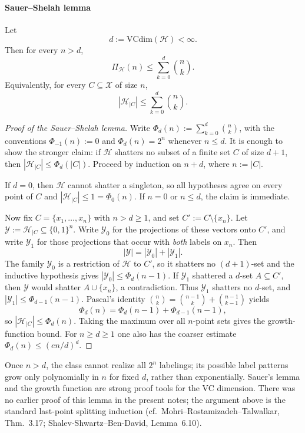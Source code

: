 \documentclass[11pt,a4paper]{article}
\theoremstyle{definition}
\begin{document}
\paragraph{Sauer--Shelah lemma}
\label{lem:sauer-shelah}

Let
\[
d := \text{VCdim}(\mathcal{H}) < \infty.
\]
Then for every $n > d$,
\[
\Pi_{\mathcal{H}}(n) \leq \sum_{k=0}^{d} \binom{n}{k}.
\]
Equivalently, for every $C \subseteq \mathcal{X}$ of size $n$,
\[
|\mathcal{H}_{|C}| \leq \sum_{k=0}^{d} \binom{n}{k}.
\]
\begin{proof}[Proof of the Sauer--Shelah lemma]
\label{prf:sauer-shelah}
Write \(\Phi_d(n):=\sum_{k=0}^{d}\binom{n}{k}\), with the conventions \(\Phi_{-1}(n):=0\) and \(\Phi_d(n)=2^n\) whenever \(n\le d\). It is enough to show the stronger claim: if \(\mathcal{H}\) shatters no subset of a finite set \(C\) of size \(d+1\), then \(|\mathcal{H}_{|C}|\le\Phi_d(|C|)\). Proceed by induction on \(n+d\), where \(n:=|C|\).

If \(d=0\), then \(\mathcal{H}\) cannot shatter a singleton, so all hypotheses agree on every point of \(C\) and \(|\mathcal{H}_{|C}|\le 1=\Phi_0(n)\). If \(n=0\) or \(n\le d\), the claim is immediate.

Now fix \(C=\{x_1,\dots,x_n\}\) with \(n>d\ge 1\), and set \(C':=C\setminus\{x_n\}\). Let \(\mathcal{Y}:=\mathcal{H}_{|C}\subseteq\{0,1\}^n\). Write \(\mathcal{Y}_0\) for the projections of these vectors onto \(C'\), and write \(\mathcal{Y}_1\) for those projections that occur with \emph{both} labels on \(x_n\). Then
\[
|\mathcal{Y}|=|\mathcal{Y}_0|+|\mathcal{Y}_1|.
\]
The family \(\mathcal{Y}_0\) is a restriction of \(\mathcal{H}\) to \(C'\), so it shatters no \((d+1)\)-set and the inductive hypothesis gives \(|\mathcal{Y}_0|\le\Phi_d(n-1)\). If \(\mathcal{Y}_1\) shattered a \(d\)-set \(A\subseteq C'\), then \(\mathcal{Y}\) would shatter \(A\cup\{x_n\}\), a contradiction. Thus \(\mathcal{Y}_1\) shatters no \(d\)-set, and \(|\mathcal{Y}_1|\le\Phi_{d-1}(n-1)\). Pascal's identity \(\binom{n}{k}=\binom{n-1}{k}+\binom{n-1}{k-1}\) yields
\[
\Phi_d(n)=\Phi_d(n-1)+\Phi_{d-1}(n-1),
\]
so \(|\mathcal{H}_{|C}|\le\Phi_d(n)\). Taking the maximum over all \(n\)-point sets gives the growth-function bound. For \(n\ge d\ge 1\) one also has the coarser estimate \(\Phi_d(n)\le(en/d)^d\).
\end{proof}
\begin{note}
    Once $n > d$, the class cannot realize all $2^n$ labelings; its possible label patterns grow only polynomially in $n$ for fixed $d$, rather than exponentially. Sauer's lemma and the growth function are strong proof tools for the VC dimension. There was no earlier proof of this lemma in the present notes; the argument above is the standard last-point splitting induction (cf.\ Mohri--Rostamizadeh--Talwalkar, Thm.~3.17; Shalev-Shwartz--Ben-David, Lemma~6.10).
\end{note}
\end{document}
